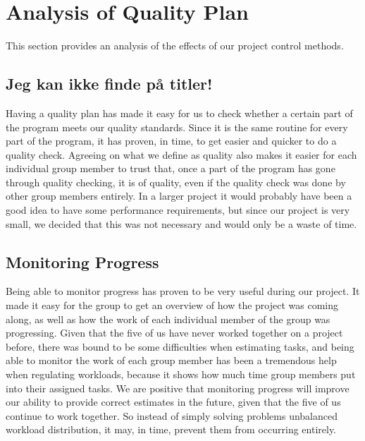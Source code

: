 \section{Analysis of Quality Plan}
This section provides an analysis of the effects of our project control methods.
\label{sec:AnalysisQualityControl}
\subsection{Jeg kan ikke finde på titler!}
Having a quality plan has made it easy for us to check whether a certain part of the program meets our quality standards. Since it is the same routine for every part of the program, it has proven, in time, to get easier and quicker to do a quality check. Agreeing on what we define as quality also makes it easier for each individual group member to trust that, once a part of the program has gone through quality checking, it is of quality, even if the quality check was done by other group members entirely. In a larger project it would probably have been a good idea to have some performance requirements, but since our project is very small, we decided that this was not necessary and would only be a waste of time.

\subsection{Monitoring Progress}
Being able to monitor progress has proven to be very useful during our project. It made it easy for the group to get an overview of how the project was coming along, as well as how the work of each individual member of the group was progressing. Given that the five of us have never worked together on a project before, there was bound to be some difficulties when estimating tasks, and being able to monitor the work of each group member has been a tremendous help when regulating workloads, because it shows how much time group members put into their assigned tasks.
We are positive that monitoring progress will improve our ability to provide correct estimates in the future, given that the five of us continue to work together. So instead of simply solving problems unbalanced workload distribution, it may, in time, prevent them from occurring entirely.
